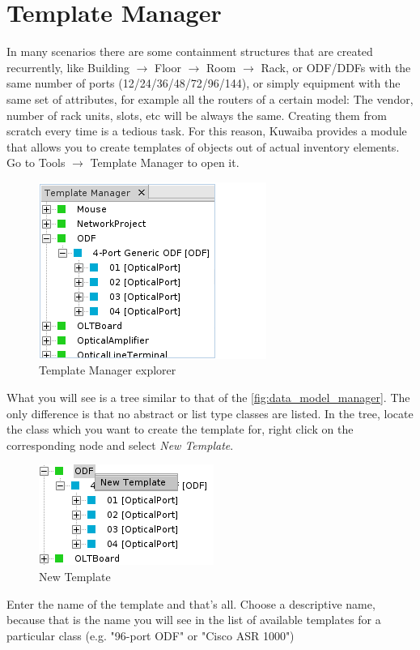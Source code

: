 \documentclass[a4paper]{article}
\begin{document}
	\clearpage
	\section{Template Manager} \label{sec:template_manager}
	In many scenarios there are some containment structures that are created recurrently, like Building $\rightarrow$ Floor $\rightarrow$ Room $\rightarrow$ Rack, or ODF/DDFs with the same number of ports (12/24/36/48/72/96/144), or simply equipment with the same set of attributes, for example all the routers of a certain model: The vendor, number of rack units, slots, etc will be always the same. Creating them from scratch every time is a tedious task. For this reason, Kuwaiba provides a module that allows you to create templates of objects out of actual inventory elements. Go to Tools $\rightarrow$ Template Manager to open it.
	
	\begin{figure}[h!]
		\centering
		\includegraphics[width=0.4\linewidth]{img/template_manager_intro.png}
		\caption{Template Manager explorer}
		\label{fig:template_manager_intro}
	\end{figure}

	What you will see is a tree similar to that of the \ref{fig:data_model_manager}. The only difference is that no abstract or list type classes are listed. In the tree, locate the class which you want to create the template for, right click on the corresponding node and select \textit{New Template}.
	
	\begin{figure}[h!]
		\centering
		\includegraphics[width=0.3\linewidth]{img/template_manager_new_template.png}
		\caption{New Template}
		\label{fig:template_manager_new_template}
	\end{figure}
	
	Enter the name of the template and that's all. Choose a descriptive name, because that is the name you will see in the list of available templates for a particular class (e.g. "96-port ODF" or "Cisco ASR 1000")
	
\end{document}
